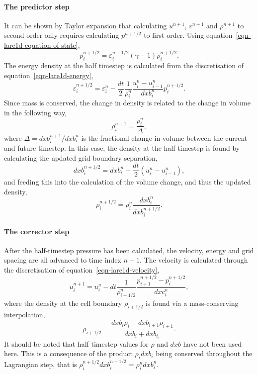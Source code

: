 \paragraph{The predictor step}
It can be shown by Taylor expansion that calculating $u^{n+1}$, $\varepsilon^{n+1}$ and $\rho^{n+1}$ to second order only requires calculating $p^{n+1/2}$ to first order. Using equation~\eqref{eqn-lare1d-equation-of-state},
\begin{equation}
  p_i^{n+1/2} = \varepsilon_i^{n+1/2}(\gamma-1)\rho_i^{n+1/2}.
  \label{eqn-predictor-pressure}
\end{equation}
The energy density at the half timestep is calculated from the discretisation of equation~\eqref{eqn-lare1d-energy},
\begin{equation}
  \varepsilon_i^{n+1/2} = \varepsilon_i^{n} - \frac{dt}{2} \frac{1}{\rho_i^n} \frac{u_i^n - u_{i-1}^n}{dxb_i^n}p_i^{n+1/2}.
  \label{eqn-predictor-energy}
\end{equation}
Since mass is conserved, the change in density is related to the change in volume in the following way,
\begin{equation}
  \rho_i^{n+1} = \frac{\rho_i^{n}}{\Delta},
\end{equation}
where $\Delta = dxb_i^{n+1}/dxb_i^{n}$ is the fractional change in volume between the current and future timestep. In this case, the density at the half timestep is found by calculating the updated grid boundary separation,
\begin{equation}
  dxb_i^{n+1/2} = dxb_i^n + \frac{dt}{2}(u_i^n - u_{i-1}^n),
  \label{eqn-predictor-boundary-distance}
\end{equation}
and feeding this into the calculation of the volume change, and thus the updated density,
\begin{equation}
  \rho_i^{n+1/2} = \rho_i^n \frac{dxb_i^n}{dxb_i^{n+1/2}}.
  \label{eqn-predictor-density}
\end{equation}

\paragraph{The corrector step}
\label{sec-corrector-step}
After the half-timestep pressure has been calculated, the velocity, energy and grid spacing are all advanced to time index $n+1$. The velocity is calculated through the discretisation of equation~\eqref{eqn-lare1d-velocity},
\begin{equation}
  u_i^{n+1} = u_i^n - dt \frac{1}{\rho^n_{i+1/2}}\frac{p^{n+1/2}_{i+1} - p^{n+1/2}_i}{dxc_i^n},
  \label{}
\end{equation}
where the density at the cell boundary $\rho_{i+1/2}$ is found via a mass-conserving interpolation,
\begin{equation}
  \rho_{i+1/2} = \frac{dxb_i \rho_i + dxb_{i+1}\rho_{i+1}}{dxb_i + dxb_{i_1}}.
  \label{eqn-lagrangian-density-interpolation}
\end{equation}
It should be noted that half timestep values for $\rho$ and $dxb$ have not been used here. This is a consequence of the product $\rho_i dxb_i$ being conserved throughout the Lagrangian step, that is $\rho_i^{n+1/2} dxb_i^{n+1/2} = \rho_i^n dxb_i^n$.

